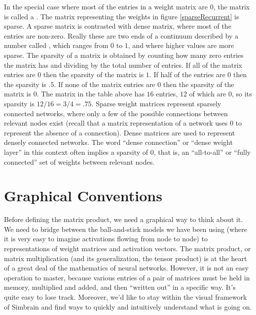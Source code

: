 In the special case where most of the entries in a weight matrix are $0$, the matrix is called a . The matrix representing the weights in figure \ref{sparseRecurrent} is sparse. A sparse matrix is contrasted with dense matrix, where most of the entries are non-zero. Really these are two ends of a continuum described by a number called , which ranges from $0$ to $1$, and where higher values are more sparse. The sparsity of a matrix is obtained by counting how many zero entries the matrix has and dividing by the total number of entries. If all of the matrix entries are $0$ then the sparsity of the matrix is $1$. If half of the entries are $0$ then the sparsity is $.5$. If none of the matrix entries are $0$ then the sparsity of the matrix is $0$. The matrix in the table above has $16$ entries, $12$ of which are $0$, so its sparsity is $12/16 = 3/4 = .75$. Sparse weight matrices represent sparsely connected networks, where only a few of the possible connections between relevant nodes exist (recall that a matrix representation of a network uses $0$ to represent the absence of a connection). Dense matrices are used to represent densely connected networks. The word ``dense connection'' or ``dense weight layer'' in this context often implies a sparsity of $0$, that is, an ``all-to-all'' or ``fully connected'' set of weights between relevant nodes.

\section{Graphical Conventions}\label{sourceTarget} 



Before defining the matrix product, we need a graphical way to think about it. We need to bridge between the ball-and-stick models we have been using (where it is very easy to imagine activations flowing from node to node) to representations of weight matrices and activation vectors. The matrix product, or matrix multiplication (and its generalization, the tensor product) is at the heart of a great deal of the mathematics of neural networks. However, it is not an easy operation to master, because various entries of a pair of matrices must be held in memory, multiplied and added, and then ``written out'' in a specific way. It's quite easy to lose track. Moreover, we'd like to stay within the visual framework of Simbrain and find ways to quickly and intuitively understand what is going on. 

